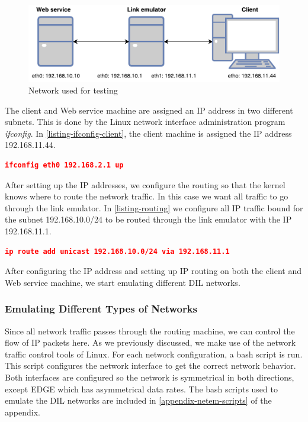 \begin{figure}[h]
\includegraphics[width=\textwidth]{images/testing_environment.pdf}
\caption{Network used for testing}
\label{figure-testing-environment}
\end{figure}

The client and Web service machine are assigned an IP address in two different
subnets. This is done by the Linux network interface administration program
\textit{ifconfig}. In \cref{listing-ifconfig-client}, the client machine is
assigned the IP address 192.168.11.44.

\begin{lstlisting}[frame=single, language=json, caption="Setting the IP address a network interface", label=listing-ifconfig-client]
ifconfig eth0 192.168.2.1 up
\end{lstlisting}

After setting up the IP addresses, we configure the routing so that the kernel
knows where to route the network traffic. In this case we want all traffic to go
through the link emulator. In \cref{listing-routing} we configure all IP traffic
bound for the subnet 192.168.10.0/24 to be routed through the link emulator with
the IP 192.168.11.1.

\begin{lstlisting}[frame=single, language=json, caption="Configuring routing rules", label=listing-routing]
ip route add unicast 192.168.10.0/24 via 192.168.11.1
\end{lstlisting}

After configuring the IP address and setting up IP routing on both the client
and Web service machine, we start emulating different DIL networks.

\subsubsection{Emulating Different Types of Networks}

Since all network traffic passes through the routing machine, we can control the
flow of IP packets here. As we previously discussed, we make use of the network
traffic control tools of Linux. For each network configuration, a bash script is
run. This script configures the network interface to get the correct network
behavior. Both interfaces are configured so the network is symmetrical in both
directions, except EDGE which has asymmetrical data rates. The bash scripts used
to emulate the DIL networks are included in \cref{appendix-netem-scripts} of the
appendix.


